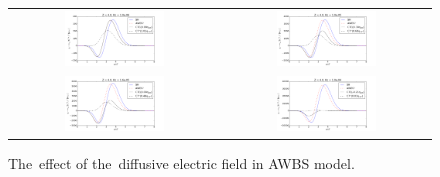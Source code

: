 \documentclass[preprint,12pt]{elsarticle}
\begin{document}
\begin{figure}[tbh]
  \begin{center}
    \begin{tabular}{cc}
      \includegraphics[width=0.5\textwidth]{../results/fe_analysis/figs/Efield_P8_Kn1e-6_Z4.png} &
      \includegraphics[width=0.5\textwidth]{../results/fe_analysis/figs/Efield_P8_Kn1e-5_Z4.png} \\
       \includegraphics[width=0.5\textwidth]{../results/fe_analysis/figs/Efield_P8_Kn16e-6_Z4.png} &
      \includegraphics[width=0.5\textwidth]{../results/fe_analysis/figs/Efield_P8_Kn1e-4_Z4.png}     
    \end{tabular}
  \caption{
  The~effect of the~diffusive electric field in AWBS model.
  }
  \end{center}
  \label{fig:EfieldAWBS}
\end{figure}
\end{document}
